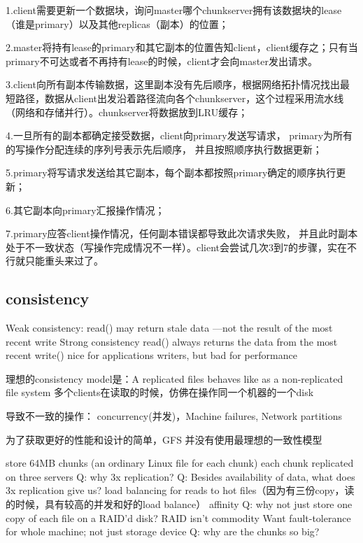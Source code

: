 1.client需要更新一个数据块，询问master哪个chunkserver拥有该数据块的lease（谁是primary）以及其他replicas（副本）的位置；

2.master将持有lease的primary和其它副本的位置告知client，client缓存之；只有当primary不可达或者不再持有lease的时候，client才会向master发出请求。

3.client向所有副本传输数据，这里副本没有先后顺序，根据网络拓扑情况找出最短路径，数据从client出发沿着路径流向各个chunkserver，这个过程采用流水线（网络和存储并行）。chunkserver将数据放到LRU缓存；

4.一旦所有的副本都确定接受数据，client向primary发送写请求，
primary为所有的写操作分配连续的序列号表示先后顺序，
并且按照顺序执行数据更新；

5.primary将写请求发送给其它副本，每个副本都按照primary确定的顺序执行更新；

6.其它副本向primary汇报操作情况；

7.primary应答client操作情况，任何副本错误都导致此次请求失败，
并且此时副本处于不一致状态（写操作完成情况不一样）。client会尝试几次3到7的步骤，实在不行就只能重头来过了。

\subsection{consistency}
Weak consistency: read() may return stale data ---not the result of the most recent write
Strong consistency read() always returns the data from the most recent write()
nice for applications writers, but bad for performance


理想的consistency model是：A replicated files behaves like as a non-replicated file system
多个clients在读取的时候，仿佛在操作同一个机器的一个disk

导致不一致的操作：
concurrency(并发)，Machine failures, Network partitions

为了获取更好的性能和设计的简单，GFS 并没有使用最理想的一致性模型

store 64MB chunks (an ordinary Linux file for each chunk)
    each chunk replicated on three servers
    Q: why 3x replication?
    Q: Besides availability of data, what does 3x replication give us?
       load balancing for reads to hot files（因为有三份copy，读的时候，具有较高的并发和好的load balance）
       affinity
    Q: why not just store one copy of each file on a RAID'd disk?
       RAID isn't commodity
       Want fault-tolerance for whole machine; not just storage device
    Q: why are the chunks so big?
    
